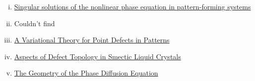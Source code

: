 \documentclass[12pt]{article}
\newcounter{solution}
\begin{document}
\begin{enumerate}[(i)]
\item \href{https://pdf.sciencedirectassets.com/271541/1-s2.0-S0375960100X13382/1-s2.0-037596019190691Z/main.pdf?X-Amz-Security-Token=IQoJb3JpZ2luX2VjEMz%2F%2F%2F%2F%2F%2F%2F%2F%2F%2FwEaCXVzLWVhc3QtMSJIMEYCIQDmgJCN2AXkLqtHlQc%2BSmt23BPsqbA%2FWFrocuHJ5wB4BAIhAM%2FiV0%2BhuJU5d0JkH2aI6SD0IcEPYQexdv%2F66XjjZa3GKtIECFUQBRoMMDU5MDAzNTQ2ODY1IgzlMl0HU6icOlO2OLUqrwTmMqvLGAzFqfbnF7Cv7v98kHGPoB%2FYF%2FFBxg7s1F8d8bifhuil9hzMLkFk4wsyGrDrPjskhbLBGDlyPNaMvPL02VoQvVQQdAI2Mev9OOZdZmVx0RBJJYzRdyXwQNUVqjpkRuEuOrLmIH3q9122ts98vZ043Ht4fdEaMfP7QULxQuMPr9oYcjVp0UCbVbs0tQwvQyLhRq61SxRta7rATbBmnKXxLhuE5B44QVoKKj4p7PG9WveN0B2YsTzOye3ka0u35%2FrO7vE7EP3vOhZ2VK4y4adI%2FcSW4iamBgf%2F6J6zxzakx0GLGDed10WjOsoEuNzKzKX3pf1Z%2BD%2Frv1CoI1jrsr6knS6tT5IW9fLOXlJqsgl%2BDmrpd8hSP%2Bf9lponX8jSYxi3q6ICp68RMmZOYihkQIyS6EfuOjrRsqTgQBLMXBtYQNvJefhTTkt%2BCLCcsVESTMuHK4D4Mfnv%2BkTRE6C7kk8%2BduqsvUANhghmH%2FFyBA3ZX7ZvhwzW0px0ysyeq%2FvrznYznvA66crCMPZCAZ8nMs844QTaShXdaOSTkgs1KjF8MITLsDMqqhUiOxenwyIT1bCmCObo3m6OtRnZiybqICNv4sfagR3bwhvkfxzgaYz0VIYJ%2F5NofniPpY7eTuP8gPCled%2FjvKmZbropA2%2F%2B3ldYFQfSmB2F8iFjv3%2Bq2%2BQQ0LQqFVK%2BxEyINNP9T1lMhQmPiX3ZaqD6H9L7sA%2BtofzF7IOGroipJ9Tr31rGMO%2Bsu5gGOqgBqAJ177QWbZXYnyInbh03fR%2FCtJJiVGegVZD1KVfxFMVbIIyxFido1ooHEGM%2F6NTjI3Qb9PQkuiKq%2FR74BCOsyYMYLpG%2FMTduVKwOkY4SEMjb6qepRKJnJXUv3ZKrfXT%2Fga44QEYuXDIgyWtBK5hwv8YWPYLZuAVrZlW4WaEXwYx2ksKL82WyIBm2kYYWE69S9WgSzs2EekG%2BRep3LUoEc4lnG4Ave9XC&X-Amz-Algorithm=AWS4-HMAC-SHA256&X-Amz-Date=20220831T041218Z&X-Amz-SignedHeaders=host&X-Amz-Expires=300&X-Amz-Credential=ASIAQ3PHCVTYYLVF2N6X%2F20220831%2Fus-east-1%2Fs3%2Faws4_request&X-Amz-Signature=7667da2fbbb74b6639bc8128efd3ee63232c4032ce9f0015b62a1f08591ed86e&hash=11854fd2fdbbbfc1d59068dd657af6ae7f2fd381b9c20f50f3edc1d66c5f70c2&host=68042c943591013ac2b2430a89b270f6af2c76d8dfd086a07176afe7c76c2c61&pii=037596019190691Z&tid=spdf-288c08ba-e923-43b8-a6de-ec98e989788f&sid=f4108f064053494679698ac9f79c6b821331gxrqa&type=client&ua=4d54575503045b5a0206&rr=7432ed58aeef1b14}{Singular solutions of the nonlinear phase equation in pattern-forming systems}
    \item Couldn't find
    \item \href{https://link-springer-com.ezproxy2.library.arizona.edu/content/pdf/10.1007/s00332-008-9035-9.pdf}{A Variational Theory for Point Defects in Patterns}
    \item \href{https://link.springer.com/content/pdf/10.1007/s00220-019-03366-y.pdf}{Aspects of Defect Topology in Smectic Liquid Crystals}
    \item \href{https://www.math.arizona.edu/~anewell/publications/Geometry_Phase_Diffusion_Eq.pdf}{The Geometry of the Phase Diffusion Equation}
\end{enumerate}
\end{document}
